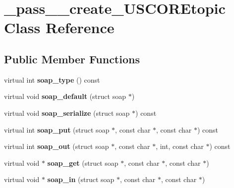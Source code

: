 \hypertarget{class__pass____create__USCOREtopic}{
\section{\_\-pass\_\-\_\-create\_\-USCOREtopic Class Reference}
\label{class__pass____create__USCOREtopic}
}
\subsection*{Public Member Functions}
\begin{DoxyCompactItemize}
\item 
\hypertarget{class__pass____create__USCOREtopic_a134daf408c9419d0ca5068c21e94787b}{
virtual int {\bfseries soap\_\-type} () const }
\label{class__pass____create__USCOREtopic_a134daf408c9419d0ca5068c21e94787b}

\item 
\hypertarget{class__pass____create__USCOREtopic_a65451db3c3c57eb569a7cc17fb56b93f}{
virtual void {\bfseries soap\_\-default} (struct soap $\ast$)}
\label{class__pass____create__USCOREtopic_a65451db3c3c57eb569a7cc17fb56b93f}

\item 
\hypertarget{class__pass____create__USCOREtopic_a083464390d37d8aa7d5842f3d7b43b2c}{
virtual void {\bfseries soap\_\-serialize} (struct soap $\ast$) const }
\label{class__pass____create__USCOREtopic_a083464390d37d8aa7d5842f3d7b43b2c}

\item 
\hypertarget{class__pass____create__USCOREtopic_af23415c4fce9cad52a2526fa8bed7aa4}{
virtual int {\bfseries soap\_\-put} (struct soap $\ast$, const char $\ast$, const char $\ast$) const }
\label{class__pass____create__USCOREtopic_af23415c4fce9cad52a2526fa8bed7aa4}

\item 
\hypertarget{class__pass____create__USCOREtopic_ae827467a9344a4ab360884b3b74729f4}{
virtual int {\bfseries soap\_\-out} (struct soap $\ast$, const char $\ast$, int, const char $\ast$) const }
\label{class__pass____create__USCOREtopic_ae827467a9344a4ab360884b3b74729f4}

\item 
\hypertarget{class__pass____create__USCOREtopic_af3f66667ce2ea31dec4380fe4f907a8a}{
virtual void $\ast$ {\bfseries soap\_\-get} (struct soap $\ast$, const char $\ast$, const char $\ast$)}
\label{class__pass____create__USCOREtopic_af3f66667ce2ea31dec4380fe4f907a8a}

\item 
\hypertarget{class__pass____create__USCOREtopic_a3ee6a4ea0f18391f2bc4294027074480}{
virtual void $\ast$ {\bfseries soap\_\-in} (struct soap $\ast$, const char $\ast$, const char $\ast$)}
\label{class__pass____create__USCOREtopic_a3ee6a4ea0f18391f2bc4294027074480}

\end{DoxyCompactItemize}
